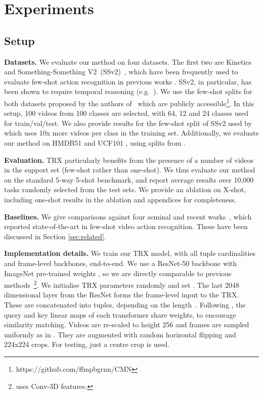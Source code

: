 \documentclass[final]{cvpr}
\begin{document}
\section{Experiments}



\subsection{Setup}

\noindent \textbf{Datasets.}
We evaluate our method on four datasets. The first two are Kinetics~\cite{Carreira} and Something-Something V2~(SSv2)~\cite{Goyal2017}, which have been frequently used to evaluate few-shot action recognition in previous works \cite{Zhu2018,Bishay2019,Zhang2020,Cao2020}.  SSv2, in particular, has been shown to require temporal reasoning (e.g.~\cite{Zhou_2018_ECCV,Price,Jiang2019}). We use the few-shot splits for both datasets proposed by the authors of~\cite{Zhu2018,Zhu2020} which are publicly accessible\footnote{https://github.com/ffmpbgrnn/CMN}. In this setup, 100 videos from 100 classes are selected, with 64, 12 and 24 classes used for train/val/test.  We also provide results for the few-shot split of SSv2 used by \cite{Cao2020} which uses 10x more videos per class in the training set.
Additionally, we evaluate our method on HMDB51 \cite{Kuehnea} and UCF101 \cite{Soomro2012}, using splits from \cite{Zhang2020}. 


\noindent \textbf{Evaluation.}
TRX particularly benefits from the presence of a number of videos in the support set (\ie few-shot rather than one-shot). We thus evaluate our method on the standard 5-way 5-shot benchmark, and report average results over 10,000 tasks randomly selected from the test sets.
We provide an ablation on X-shot, including one-shot results in the ablation and appendices for completeness.

\noindent \textbf{Baselines.} We give comparisons against four seminal and recent works~\cite{Zhu2018, Bishay2019,Zhang2020,Cao2020}, which reported state-of-the-art in few-shot video action recognition. These have been discussed in Section \ref{sec:related}. 


\noindent \textbf{Implementation details.}
We train our TRX model, with all tuple cardinalities and frame-level backbones, end-to-end.
We use a ResNet-50 backbone \cite{He2016} with ImageNet pre-trained weights \cite{Deng2009}, so we are directly comparable to previous methods~\cite{Zhu2018,Zhu2020,Cao2020}\footnote{\cite{Zhang2020} uses Conv-3D features.}. 
We initialise TRX parameters randomly and set .
The last 2048 dimensional layer from the ResNet forms the frame-level input to the TRX.
These are concatenated into tuples, depending on the length~.
Following \cite{Doersch2020}, the query and key linear maps of each transformer share weights, to encourage similarity matching. 
Videos are re-scaled to height 256 and  frames are sampled uniformly as in \cite{Wanga}.  They are augmented with random horizontal flipping and 224x224 crops. For testing, just a centre crop is used.  
\end{document}

